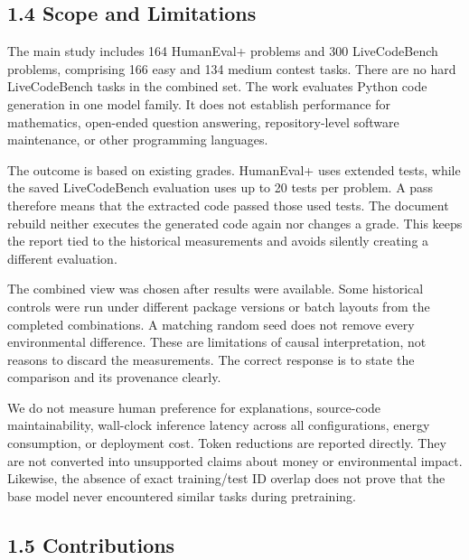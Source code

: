 \documentclass[11pt,letterpaper]{article}
\begin{document}
\subsection*{1.4 Scope and Limitations}

The main study includes 164 HumanEval+ problems and 300 LiveCodeBench problems, comprising 166 easy and 134 medium contest tasks. There are no hard LiveCodeBench tasks in the combined set. The work evaluates Python code generation in one model family. It does not establish performance for mathematics, open-ended question answering, repository-level software maintenance, or other programming languages.\par

The outcome is based on existing grades. HumanEval+ uses extended tests, while the saved LiveCodeBench evaluation uses up to 20 tests per problem. A pass therefore means that the extracted code passed those used tests. The document rebuild neither executes the generated code again nor changes a grade. This keeps the report tied to the historical measurements and avoids silently creating a different evaluation.\par

The combined view was chosen after results were available. Some historical controls were run under different package versions or batch layouts from the completed combinations. A matching random seed does not remove every environmental difference. These are limitations of causal interpretation, not reasons to discard the measurements. The correct response is to state the comparison and its provenance clearly.\par

We do not measure human preference for explanations, source-code maintainability, wall-clock inference latency across all configurations, energy consumption, or deployment cost. Token reductions are reported directly. They are not converted into unsupported claims about money or environmental impact. Likewise, the absence of exact training/test ID overlap does not prove that the base model never encountered similar tasks during pretraining.\par

\subsection*{1.5 Contributions}
\end{document}
